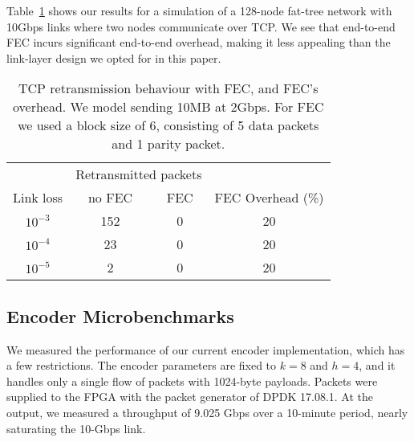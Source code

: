 Table~\ref{tab:ns3} shows our results for a simulation of a 128-node
fat-tree network with 10Gbps links where two nodes communicate over
TCP. We see that end-to-end FEC incurs significant end-to-end
overhead, making it less appealing than the link-layer design we opted
for in this paper.

\begin{table}
\begin{center}
\small
\begin{tabular}{c|cc|c}
\toprule
 & \multicolumn{2}{|c|}{Retransmitted packets} & \\
Link loss & no FEC & FEC & FEC Overhead (\%) \\
\midrule
$10^{-3}$ & 152  & 0 & 20 \\
$10^{-4}$ & 23   & 0 & 20 \\
$10^{-5}$ & 2    & 0 & 20 \\
\bottomrule
\end{tabular}
\caption{TCP retransmission behaviour with FEC, and FEC's overhead.
  We model sending 10MB at 2Gbps. For FEC we used a block size of 6,
  consisting of 5 data packets and 1 parity packet.
}
\label{tab:ns3}
\end{center}
\end{table}


\subsection{Encoder Microbenchmarks}
\iffalse
Here we evaluate the implementation directly, not using a model.
Latency and throughput graphs for experiments involving different loss rates, and the encoder working on the CPU and FPGA.
Note: we have not optimized the CPU implementation.
\fi
We measured the performance of our current encoder implementation, which has a
few restrictions.  The encoder parameters are fixed to $k = 8$ and $h = 4$,
and it handles only a single flow of packets with 1024-byte payloads.
Packets were supplied to the FPGA with the packet generator of DPDK 17.08.1.
At the output, we measured a throughput of 9.025 Gbps over a 10-minute period,
nearly saturating the 10-Gbps link.

\iffalse
To ensure \OurSys's effect observed in the model are practical, we directly measured the 
full throughput of our encoder implementation in FPGA. For our benchmark, the encoder is configured to use
k=8 and h=4. Packets are generated by a tool based
on DPDK library, and are fed to the board (as is specified above~(\S\ref{sec:implementation})) through
a 10Gbps link. The average outgoing throughput measured during a 10 minutes test is 9.025Gbps.
Considering the overhead from other parts of the system, we believe the link is actually close
to being saturated, which is our basic assumption in evaluations.
\fi

